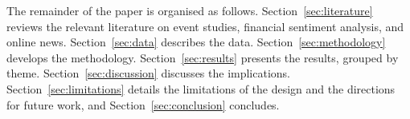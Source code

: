The remainder of the paper is organised as follows.
Section~\ref{sec:literature} reviews the relevant literature on event
studies, financial sentiment analysis, and online news.
Section~\ref{sec:data} describes the data.
Section~\ref{sec:methodology} develops the methodology.
Section~\ref{sec:results} presents the results, grouped by theme.
Section~\ref{sec:discussion} discusses the implications.
Section~\ref{sec:limitations} details the limitations of the design
and the directions for future work, and Section~\ref{sec:conclusion}
concludes.
